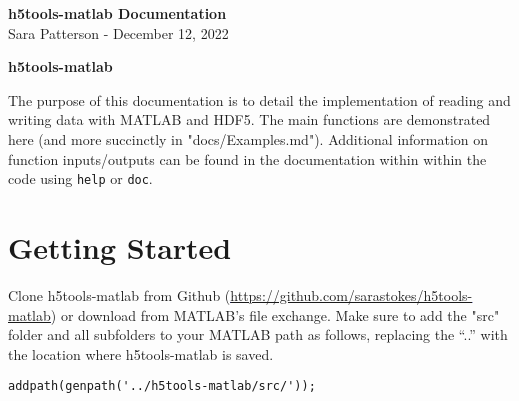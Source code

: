 \documentclass[11pt]{exam}
\newcommand\myurl[1]{\textcolor{blue}{\underline{#1}}}
\begin{document}
    \noindent 
    \begin{center}
        {\LARGE\textbf{h5tools-matlab Documentation}}
        \\\vspace{1.5ex}
        {\large Sara Patterson - December 12, 2022}
    \end{center}

    \tableofcontents
    \pagebreak 

	\begin{center}
		\textbf{\Huge h5tools-matlab}
	\end{center}

	\noindent The purpose of this documentation is to detail the implementation of reading and writing data with MATLAB and HDF5. 
    The main functions are demonstrated here (and more succinctly in "docs/Examples.md"). Additional information on function inputs/outputs can be found in the documentation within within the code using \texttt{help} or \texttt{doc}. 

    \section{Getting Started}
    \noindent Clone h5tools-matlab from Github (\myurl{\url{https://github.com/sarastokes/h5tools-matlab}}) or download from MATLAB's file exchange. Make sure to add the "src" folder and all subfolders to your MATLAB path as follows, replacing the ``..'' with the location where h5tools-matlab is saved.
    \begin{lstlisting}[style=matlab-editor, basicstyle=\mlttfamily\footnotesize]
addpath(genpath('../h5tools-matlab/src/'));
    \end{lstlisting}


                                                                      
\end{document}
